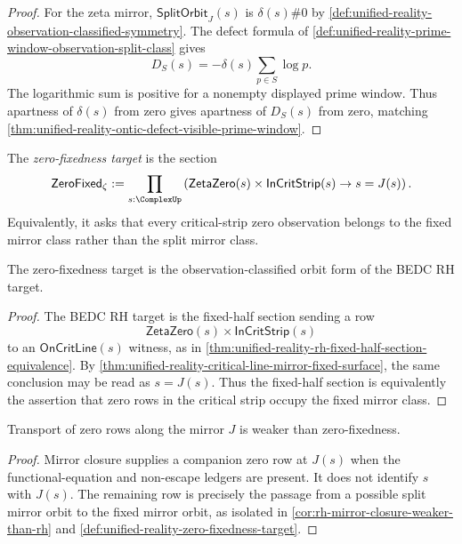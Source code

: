 \begin{proof}
For the zeta mirror, $\mathsf{SplitOrbit}_{J}(s)$ is
$\delta(s)\#0$ by
\autoref{def:unified-reality-observation-classified-symmetry}.  The
defect formula of
\autoref{def:unified-reality-prime-window-observation-split-class} gives
$$
D_S(s)
=
-\delta(s)\sum_{p\in S}\log p.
$$
The logarithmic sum is positive for a nonempty displayed prime window.
Thus apartness of $\delta(s)$ from zero gives apartness of $D_S(s)$
from zero, matching
\autoref{thm:unified-reality-ontic-defect-visible-prime-window}.
\end{proof}

\begin{definition}
\label{def:unified-reality-zero-fixedness-target}
The \emph{zero-fixedness target} is the section
$$
\mathsf{ZeroFixed}_{\zeta}
:=
\prod_{s:\ComplexUp}
\left(
\mathsf{ZetaZero}(s)\times\mathsf{InCritStrip}(s)
\to
s=J(s)
\right).
$$
Equivalently, it asks that every critical-strip zero observation belongs
to the fixed mirror class rather than the split mirror class.
\end{definition}

\begin{theorem}
\label{thm:unified-reality-zero-fixedness-orbit-form-rh}
The zero-fixedness target is the observation-classified orbit form of
the BEDC RH target.
\end{theorem}

\begin{proof}
The BEDC RH target is the fixed-half section sending a row
$$
\mathsf{ZetaZero}(s)\times\mathsf{InCritStrip}(s)
$$
to an $\mathsf{OnCritLine}(s)$ witness, as in
\autoref{thm:unified-reality-rh-fixed-half-section-equivalence}.  By
\autoref{thm:unified-reality-critical-line-mirror-fixed-surface}, the
same conclusion may be read as $s=J(s)$.  Thus the fixed-half section is
equivalently the assertion that zero rows in the critical strip occupy
the fixed mirror class.
\end{proof}

\begin{corollary}
\label{cor:unified-reality-mirror-closure-not-zero-fixedness}
Transport of zero rows along the mirror $J$ is weaker than
zero-fixedness.
\end{corollary}

\begin{proof}
Mirror closure supplies a companion zero row at $J(s)$ when the
functional-equation and non-escape ledgers are present.  It does not
identify $s$ with $J(s)$.  The remaining row is precisely the passage
from a possible split mirror orbit to the fixed mirror orbit, as
isolated in \autoref{cor:rh-mirror-closure-weaker-than-rh} and
\autoref{def:unified-reality-zero-fixedness-target}.
\end{proof}


